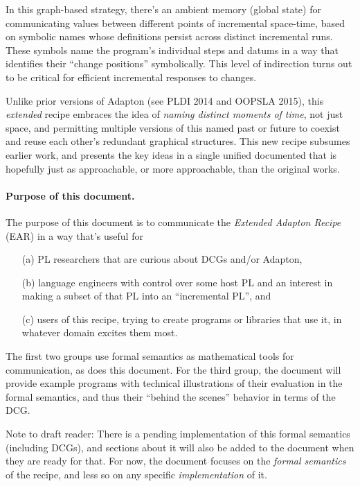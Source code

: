 \documentclass[11pt]{article}
\begin{document}
In this graph-based strategy, there's an ambient memory (global state)
for communicating values between different points of incremental
space-time, based on symbolic names whose definitions persist across
distinct incremental runs.
%
These symbols name the program's individual steps and datums in a way
that identifies their ``change positions'' symbolically.
%
This level of indirection turns out to be critical for efficient
incremental responses to changes.

Unlike prior versions of Adapton (see PLDI 2014 and OOPSLA 2015), this
\emph{extended} recipe embraces the idea of \emph{naming distinct
moments of time}, not just space, and permitting multiple versions of
this named past or future to coexist and reuse each other's redundant
graphical structures.
%
This new recipe subsumes earlier work, and presents the key ideas in a
single unified documented that is hopefully just as approachable, or
more approachable, than the original works.

\paragraph{Purpose of this document.}
%
The purpose of this document is to communicate the \emph{Extended Adapton Recipe} (EAR) in a way that's useful for\begin{itemize}
\item[(a)] PL researchers that are curious about DCGs and/or Adapton,
\item[(b)] language engineers with control over some host PL and an interest in making a subset of that PL into an ``incremental PL'', and
\item[(c)] users of this recipe, trying to create programs or libraries that use it, in whatever domain excites them most.
\end{itemize}

The first two groups use formal semantics as mathematical tools for communication, as does this document.
%
For the third group, the document will provide example programs with technical illustrations of
their evaluation in the formal semantics, and thus their ``behind the scenes'' behavior in terms of the DCG.

Note to draft reader: There is a pending implementation of this formal
semantics (including DCGs), and sections about it will also be added to the document
when they are ready for that. For now, the document focuses on the
\emph{formal semantics} of the recipe, and less so on any specific
\emph{implementation} of it.
\end{document}
